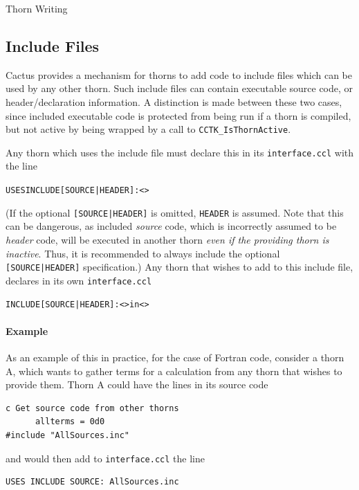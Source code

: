 \begin{cactuspart}{Thorn Writing}

\subsection{Include Files}
\label{sec:includefiles}

Cactus provides a mechanism for thorns to add code to
include files which can be used by any other thorn.
Such include files can contain executable source code, or header/declaration
information. A distinction is made between these two cases, since included
executable code is protected from being run if a thorn is compiled, but
not active by being wrapped by a call to \texttt{CCTK\_IsThornActive}.

Any thorn
which uses the include file must declare this in its
\texttt{interface.ccl} with the line

\begin{alltt}
USES INCLUDE [SOURCE|HEADER]: <>
\end{alltt}

(If the optional \verb![SOURCE|HEADER]! is omitted, \verb|HEADER| is
assumed.  Note that this can be dangerous, as included \emph{source}
code, which is incorrectly assumed to be \emph{header} code, will be
executed in another thorn \emph{even if the providing thorn is
inactive}.  Thus, it is recommended to always include the optional
\verb![SOURCE|HEADER]! specification.)  Any thorn that wishes to add
to this include file, declares in its own \texttt{interface.ccl}

\begin{alltt}
INCLUDE [SOURCE|HEADER]: <> in <>
\end{alltt}

\paragraph{Example}

As an example of this in practice, for the case of Fortran code,
consider a thorn A, which
wants to gather terms for a calculation from any thorn
that wishes to provide them. Thorn A could have
the lines in its source code

\begin{verbatim}
c Get source code from other thorns
      allterms = 0d0
#include "AllSources.inc"
\end{verbatim}
and would then add to \texttt{interface.ccl} the line
\begin{verbatim}
USES INCLUDE SOURCE: AllSources.inc
\end{verbatim}


\end{cactuspart}

